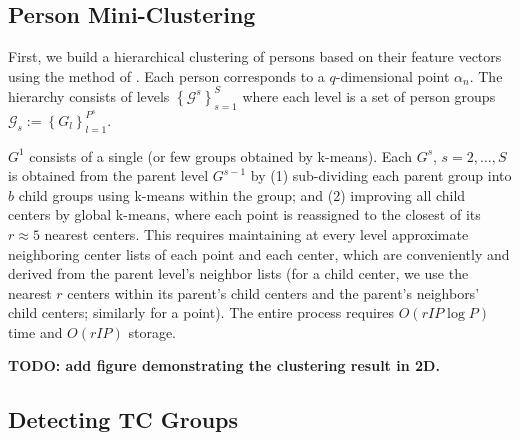 \documentclass{article}
\newcommand{\cG}{\mathcal{G}}
\begin{document}
\subsection{Person Mini-Clustering}
\label{miniclustering}
First, we build a hierarchical clustering of persons based on their feature vectors using the method of \cite{miniclustering}. Each person corresponds to a $q$-dimensional point $\alpha_n$. The hierarchy consists of levels $\left\{\cG^s\right\}_{s=1}^S$ where each level is a set of person groups $\cG_s := \left\{G_l\right\}_{l=1}^{P^s}$.

$G^1$ consists of a single (or few groups obtained by k-means). Each $G^s$, $s=2,\dots,S$ is obtained from the parent level $G^{s-1}$ by (1) sub-dividing each parent group into $b$ child groups using k-means within the group; and (2) improving all child centers by global k-means, where each point is reassigned to the closest of its $r \approx 5$ nearest centers. This requires maintaining at every level approximate neighboring center lists of each point and each center, which are conveniently and derived from the parent level's neighbor lists (for a child center, we use the nearest $r$ centers within its parent's child centers and the parent's neighbors' child centers; similarly for a point). The entire process requires $O(r I P \log P)$ time and $O(r I P)$ storage.

{\bf TODO: add figure demonstrating the clustering result in 2D.}

\subsection{Detecting TC Groups}
\label{miniclustering}
\end{document}
